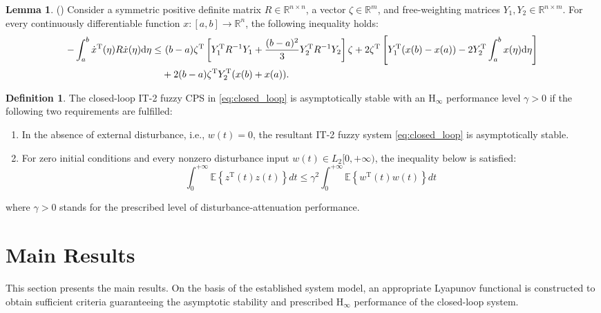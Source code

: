 \documentclass[preprint,review,fleqn,sort&compress,3p]{elsarticle}
\theoremstyle{definition} %
\theoremstyle{definition}%
\newtheorem{Lem}{Lemma}[section]
\newtheorem{Def}{Definition}[section]
\begin{document}
\begin{Lem}\label{lem2}(\cite{guanModifiedLoopedFunctional2021a}) 
Consider a symmetric positive definite matrix $R \in \mathbb{R}^{n\times n}$, a vector $\zeta \in \mathbb{R}^{m}$, and free-weighting matrices $Y_1, Y_2 \in \mathbb{R}^{n\times m}$. For every continuously differentiable function $x : [a,b] \rightarrow \mathbb{R}^{n}$, the following inequality holds:
\begin{align}
	-\int_{a}^{b} \dot{x}^{\mathrm{T}}(\eta) R \dot{x}(\eta) \mathrm{d}\eta 
	\le & \ (b-a) \zeta^{\mathrm{T}} \left[ Y_1^{\mathrm{T}} R^{-1} Y_1 
	+ \frac{(b-a)^2}{3} Y_2^{\mathrm{T}} R^{-1} Y_2 \right] \zeta 
	 + 2\zeta^{\mathrm{T}} \left[ Y_1^{\mathrm{T}} (x(b) - x(a)) 
	 - 2Y_2^{\mathrm{T}} \int_{a}^{b} x(\eta)\mathrm{d}\eta \right] \notag \\
	& + 2(b-a) \zeta^{\mathrm{T}} Y_2^{\mathrm{T}} (x(b) + x(a)).
\end{align}
\end{Lem} 

\begin{Def}\label{Def1}
	The closed-loop IT-2 fuzzy CPS in \eqref{eq:closed_loop} is asymptotically stable with an $\mathrm{H}_\infty$ performance level $\gamma>0$ if the following two requirements are fulfilled:
	
	\begin{enumerate}
		\item In the absence of external disturbance, i.e., $w(t)=0$, the resultant IT-2 fuzzy system \eqref{eq:closed_loop} is asymptotically stable.
		
		\item For zero initial conditions and every nonzero disturbance input $w(t)\in L_2[0,+\infty)$, the inequality below is satisfied:
		\begin{equation}
			\int_0^{+\infty}
			\mathbb E\left\{
			z^\mathrm{T}(t)z(t)
			\right\}dt
			\le
			\gamma^2
			\int_0^{+\infty}
			\mathbb E\left\{
			w^\mathrm{T}(t)w(t)
			\right\}dt
		\end{equation}
	\end{enumerate}
	where $\gamma>0$ stands for the prescribed level of disturbance‑attenuation performance.

\end{Def}

\section{Main Results}\label{sec3}
This section presents the main results. On the basis of the established system model, an appropriate Lyapunov functional is constructed to obtain sufficient criteria guaranteeing the asymptotic stability and prescribed $\mathrm{H}_\infty$ performance of the closed-loop system.
\end{document}
